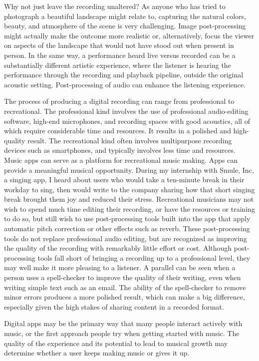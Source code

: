 Why not just leave the recording unaltered? As anyone who has tried to photograph a beautiful landscape might relate to, capturing the natural colors, beauty, and atmosphere of the scene is very challenging. Image post-processing might actually make the outcome more realistic or, alternatively, focus the viewer on aspects of the landscape that would not have stood out when present in person. In the same way, a performance heard live versus recorded can be a substantially different artistic experience, where the listener is hearing the performance through the recording and playback pipeline, outside the original acoustic setting. Post-processing of audio can enhance the listening experience. 

The process of producing a digital recording can range from professional to recreational. The professional kind involves the use of professional audio-editing software, high-end microphones, and recording spaces with good acoustics, all of which require considerable time and resources. It results in a polished and high-quality result. The recreational kind often involves multipurpose recording devices such as smartphones, and typically involves less time and resources. Music apps can serve as a platform for recreational music making. Apps can provide a meaningful musical opportunity. During my internship with Smule, Inc, a singing app, I heard about users who would take a ten-minute break in their workday to sing, then would write to the company sharing how that short singing break brought them joy and reduced their stress. Recreational musicians may not wish to spend much time editing their recording, or have the resources or training to do so, but still wish to use post-processing tools built into the app that apply automatic pitch correction or other effects such as reverb. These post-processing tools do not replace professional audio editing, but are recognized as improving the quality of the recording with remarkably little effort or cost. Although post-processing tools fall short of bringing a recording up to a professional level, they may well make it more pleasing to a listener. A parallel can be seen when a person uses a spell-checker to improve the quality of their writing, even when writing simple text such as an email. The ability of the spell-checker to remove minor errors produces a more polished result, which can make a big difference, especially given the high stakes of sharing content in a recorded format.

Digital apps may be the primary way that many people interact actively with music, or the first approach people try when getting started with music. The quality of the experience and its potential to lead to musical growth may determine whether a user keeps making music or gives it up.

